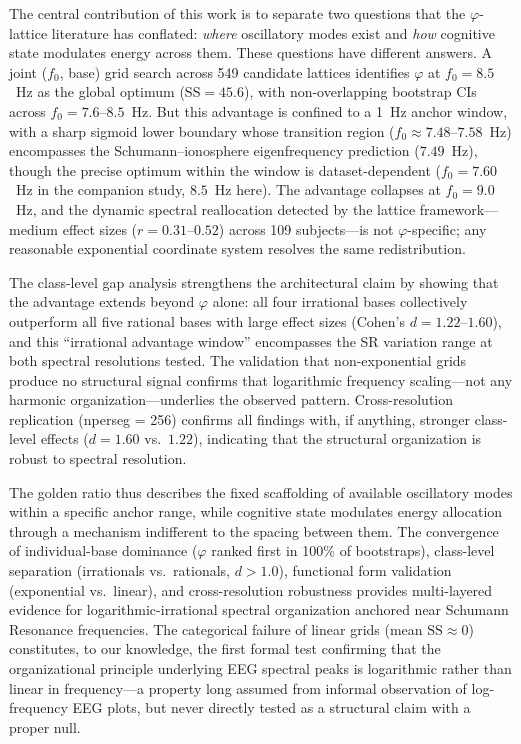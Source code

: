 \documentclass[11pt,a4paper]{article}
\newcommand{\phisym}{\varphi}
\newcommand{\fzero}{f_0}
\begin{document}
The central contribution of this work is to separate two questions that the $\phisym$-lattice literature has conflated: \emph{where} oscillatory modes exist and \emph{how} cognitive state modulates energy across them. These questions have different answers. A joint ($\fzero$, base) grid search across 549 candidate lattices identifies $\phisym$ at $\fzero = 8.5$~Hz as the global optimum ($\text{SS} = 45.6$), with non-overlapping bootstrap CIs across $\fzero = 7.6$--$8.5$~Hz. But this advantage is confined to a 1~Hz anchor window, with a sharp sigmoid lower boundary whose transition region ($\fzero \approx 7.48$--$7.58$~Hz) encompasses the Schumann--ionosphere eigenfrequency prediction ($7.49$~Hz), though the precise optimum within the window is dataset-dependent ($\fzero = 7.60$~Hz in the companion study, $8.5$~Hz here). The advantage collapses at $\fzero = 9.0$~Hz, and the dynamic spectral reallocation detected by the lattice framework---medium effect sizes ($r = 0.31$--$0.52$) across 109 subjects---is not $\phisym$-specific; any reasonable exponential coordinate system resolves the same redistribution.

The class-level gap analysis strengthens the architectural claim by showing that the advantage extends beyond $\phisym$ alone: all four irrational bases collectively outperform all five rational bases with large effect sizes (Cohen's $d = 1.22$--$1.60$), and this ``irrational advantage window'' encompasses the SR variation range at both spectral resolutions tested. The validation that non-exponential grids produce no structural signal confirms that logarithmic frequency scaling---not any harmonic organization---underlies the observed pattern. Cross-resolution replication (nperseg = 256) confirms all findings with, if anything, stronger class-level effects ($d = 1.60$ vs.\ $1.22$), indicating that the structural organization is robust to spectral resolution.

The golden ratio thus describes the fixed scaffolding of available oscillatory modes within a specific anchor range, while cognitive state modulates energy allocation through a mechanism indifferent to the spacing between them. The convergence of individual-base dominance ($\phisym$ ranked first in 100\% of bootstraps), class-level separation (irrationals vs.\ rationals, $d > 1.0$), functional form validation (exponential vs.\ linear), and cross-resolution robustness provides multi-layered evidence for logarithmic-irrational spectral organization anchored near Schumann Resonance frequencies. The categorical failure of linear grids (mean $\text{SS} \approx 0$) constitutes, to our knowledge, the first formal test confirming that the organizational principle underlying EEG spectral peaks is logarithmic rather than linear in frequency---a property long assumed from informal observation of log-frequency EEG plots, but never directly tested as a structural claim with a proper null.
\end{document}
